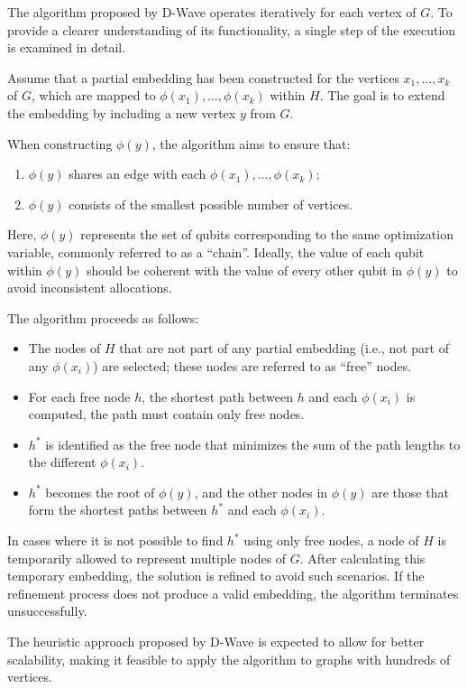 The algorithm proposed by D-Wave operates iteratively for each vertex of $G$. To provide a clearer understanding of its functionality, a single step of the execution is examined in detail.

Assume that a partial embedding has been constructed for the vertices $x_1, \dots, x_k$ of $G$, which are mapped to $\phi(x_1), \dots, \phi(x_k)$ within $H$. 
The goal is to extend the embedding by including a new vertex $y$ from $G$.

When constructing $\phi(y)$, the algorithm aims to ensure that:
\begin{enumerate}
    \item $\phi(y)$ shares an edge with each $\phi(x_1), \dots, \phi(x_k)$;
    \item $\phi(y)$ consists of the smallest possible number of vertices.
\end{enumerate}

Here, $\phi(y)$ represents the set of qubits corresponding to the same optimization variable, commonly referred to as a ``chain''. 
Ideally, the value of each qubit within $\phi(y)$ should be coherent with the value of every other qubit in $\phi(y)$ to avoid inconsistent allocations.

The algorithm proceeds as follows:
\begin{itemize}
    \item The nodes of $H$ that are not part of any partial embedding (i.e., not part of any $\phi(x_i)$) are selected; these nodes are referred to as ``free'' nodes.
    \item For each free node $h$, the shortest path between $h$ and each $\phi(x_i)$ is computed, the path must contain only free nodes.
    \item $h^*$ is identified as the free node that minimizes the sum of the path lengths to the different $\phi(x_i)$.
    \item $h^*$ becomes the root of $\phi(y)$, and the other nodes in $\phi(y)$ are those that form the shortest paths between $h^*$ and each $\phi(x_i)$.
\end{itemize}

In cases where it is not possible to find $h^*$ using only free nodes, a node of $H$ is temporarily allowed to represent multiple nodes of $G$. 
After calculating this temporary embedding, the solution is refined to avoid such scenarios. If the refinement process does not produce a valid embedding, the algorithm terminates unsuccessfully.

The heuristic approach proposed by D-Wave is expected to allow for better scalability, making it feasible to apply the algorithm to graphs with hundreds of vertices.
